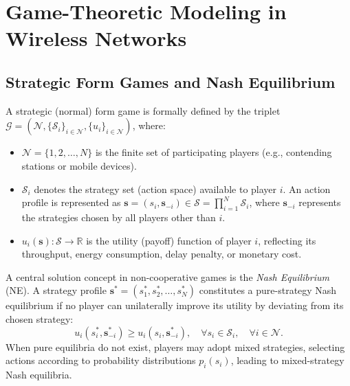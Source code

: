 \section{Game-Theoretic Modeling in Wireless Networks}
\label{sec:gt_modeling}

\subsection{Strategic Form Games and Nash Equilibrium}
A strategic (normal) form game is formally defined by the triplet $\mathcal{G} = (\mathcal{N}, \{\mathcal{S}_i\}_{i \in \mathcal{N}}, \{u_i\}_{i \in \mathcal{N}})$, where:
\begin{itemize}
    \item $\mathcal{N} = \{1, 2, \dots, N\}$ is the finite set of participating players (e.g., contending stations or mobile devices).
    \item $\mathcal{S}_i$ denotes the strategy set (action space) available to player $i$. An action profile is represented as $\mathbf{s} = (s_i, \mathbf{s}_{-i}) \in \mathcal{S} = \prod_{i=1}^N \mathcal{S}_i$, where $\mathbf{s}_{-i}$ represents the strategies chosen by all players other than $i$.
    \item $u_i(\mathbf{s}) : \mathcal{S} \to \mathbb{R}$ is the utility (payoff) function of player $i$, reflecting its throughput, energy consumption, delay penalty, or monetary cost.
\end{itemize}

A central solution concept in non-cooperative games is the \emph{Nash Equilibrium} (NE). A strategy profile $\mathbf{s}^* = (s_1^*, s_2^*, \dots, s_N^*)$ constitutes a pure-strategy Nash equilibrium if no player can unilaterally improve its utility by deviating from its chosen strategy:
\begin{equation}
    u_i(s_i^*, \mathbf{s}_{-i}^*) \ge u_i(s_i, \mathbf{s}_{-i}^*), \quad \forall s_i \in \mathcal{S}_i, \quad \forall i \in \mathcal{N}.
\end{equation}
When pure equilibria do not exist, players may adopt mixed strategies, selecting actions according to probability distributions $p_i(s_i)$, leading to mixed-strategy Nash equilibria.

